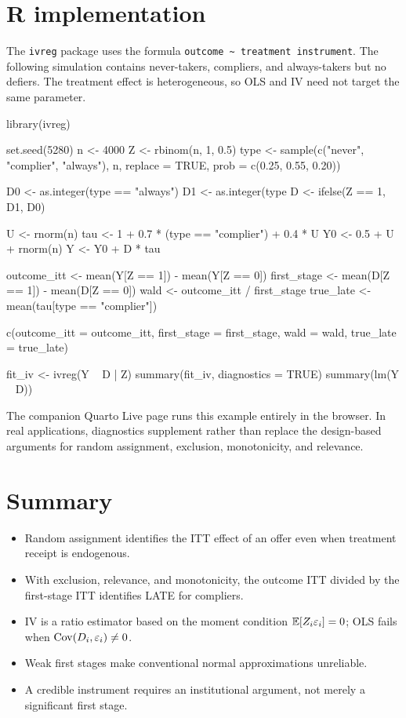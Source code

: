 \section{R implementation}
\label{sec:late-r}

The \texttt{ivreg} package uses the formula
\texttt{outcome \textasciitilde{} treatment \textbar{} instrument}.  The
following simulation contains never-takers, compliers, and always-takers but no
defiers.  The treatment effect is heterogeneous, so OLS and IV need not target
the same parameter.

\begin{rcode}
library(ivreg)

set.seed(5280)
n <- 4000
Z <- rbinom(n, 1, 0.5)
type <- sample(c("never", "complier", "always"), n,
               replace = TRUE, prob = c(0.25, 0.55, 0.20))

D0 <- as.integer(type == "always")
D1 <- as.integer(type %
D <- ifelse(Z == 1, D1, D0)

U <- rnorm(n)
tau <- 1 + 0.7 * (type == "complier") + 0.4 * U
Y0 <- 0.5 + U + rnorm(n)
Y <- Y0 + D * tau

outcome_itt <- mean(Y[Z == 1]) - mean(Y[Z == 0])
first_stage <- mean(D[Z == 1]) - mean(D[Z == 0])
wald <- outcome_itt / first_stage
true_late <- mean(tau[type == "complier"])

c(outcome_itt = outcome_itt,
  first_stage = first_stage,
  wald = wald,
  true_late = true_late)

fit_iv <- ivreg(Y ~ D | Z)
summary(fit_iv, diagnostics = TRUE)
summary(lm(Y ~ D))
\end{rcode}

The companion Quarto Live page runs this example entirely in the browser.  In
real applications, diagnostics supplement rather than replace the design-based
arguments for random assignment, exclusion, monotonicity, and relevance.

\section*{Summary}

\begin{itemize}
  \item Random assignment identifies the ITT effect of an offer even when
        treatment receipt is endogenous.
  \item With exclusion, relevance, and monotonicity, the outcome ITT divided by
        the first-stage ITT identifies LATE for compliers.
  \item IV is a ratio estimator based on the moment condition
        $\mathbb{E}[Z_i\varepsilon_i]=0$; OLS fails when
        $\operatorname{Cov}(D_i,\varepsilon_i)\neq0$.
  \item Weak first stages make conventional normal approximations unreliable.
  \item A credible instrument requires an institutional argument, not merely a
        significant first stage.
\end{itemize}
